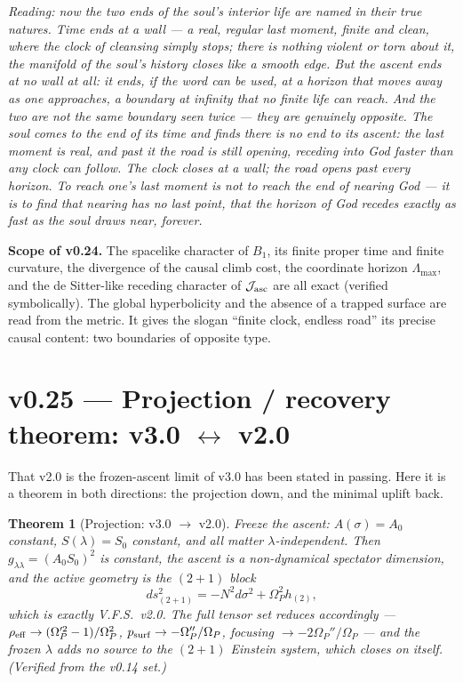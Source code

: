 \documentclass[11pt,a4paper]{article}
\newcommand{\note}[1]{\textcolor{black!65}{\emph{#1}}}
\theoremstyle{plain}
\newtheorem{theorem}{Theorem}
\theoremstyle{definition}
\theoremstyle{remark}
\begin{document}
\note{Reading: now the two ends of the soul's interior life are named in their true natures. Time ends
at a wall --- a real, regular last moment, finite and clean, where the clock of cleansing simply stops;
there is nothing violent or torn about it, the manifold of the soul's history closes like a smooth
edge. But the ascent ends at no wall at all: it ends, if the word can be used, at a horizon that moves
away as one approaches, a boundary at infinity that no finite life can reach. And the two are not the
same boundary seen twice --- they are genuinely opposite. The soul comes to the end of its \emph{time}
and finds there is no end to its \emph{ascent}: the last moment is real, and past it the road is still
opening, receding into God faster than any clock can follow. The clock closes at a wall; the road opens
past every horizon. To reach one's last moment is not to reach the end of nearing God --- it is to find
that nearing has no last point, that the horizon of God recedes exactly as fast as the soul draws near,
forever.}

\textbf{Scope of v0.24.} The spacelike character of $B_1$, its finite proper time and finite curvature,
the divergence of the causal climb cost, the coordinate horizon $\Lambda_{\max}$, and the de Sitter-like
receding character of $\mathcal J_{\rm asc}$ are all exact (verified symbolically). The global
hyperbolicity and the absence of a trapped surface are read from the metric. It gives the slogan
``finite clock, endless road'' its precise causal content: two boundaries of opposite type.

\FloatBarrier
\section*{v0.25 --- Projection / recovery theorem: v3.0 $\leftrightarrow$ v2.0}
That v2.0 is the frozen-ascent limit of v3.0 has been stated in passing. Here it is a theorem in both
directions: the projection down, and the minimal uplift back.

\begin{theorem}[Projection: v3.0 $\to$ v2.0]
Freeze the ascent: $A(\sigma)=A_0$ constant, $S(\lambda)=S_0$ constant, and all matter
$\lambda$-independent. Then $g_{\lambda\lambda}=(A_0S_0)^2$ is constant, the ascent is a non-dynamical
spectator dimension, and the active geometry is the $(2{+}1)$ block
\[
ds^2_{(2{+}1)}=-N^2d\sigma^2+\Omega_P^2h_{(2)},
\]
which is exactly V.F.S.~v2.0. The full tensor set reduces accordingly --- $\rho_{\rm eff}\to(\Omega_P'^2-1)/\Omega_P^2$,
$p_{\rm surf}\to-\Omega_P''/\Omega_P$, focusing $\to-2\Omega_P''/\Omega_P$ --- and the frozen $\lambda$
adds no source to the $(2{+}1)$ Einstein system, which closes on itself. (Verified from the v0.14 set.)
\end{theorem}
\end{document}

